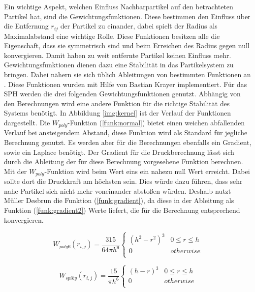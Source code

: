 \documentclass[intern,palatino]{cgBA}
\begin{document}
Ein wichtige Aspekt, welchen Einfluss Nachbarpartikel auf den betrachteten Partikel hat, sind die Gewichtungsfunktionen. Diese bestimmen den Einfluss über die Entfernung $r_{ij}$ der Partikel zu einander, dabei spielt der Radius als Maximalabstand eine wichtige Rolle. Diese Funktionen besitzen alle die Eigenschaft, dass sie symmetrisch sind und beim Erreichen des Radius gegen null konvergieren. Damit haben zu weit entfernte Partikel keinen Einfluss mehr. Gewichtungsfunktionen dienen dazu eine Stabilität in das Partikelsystem zu bringen. Dabei nähern sie sich üblich Ableitungen von bestimmten Funktionen an \cite{muller2003particle}. Diese Funktionen wurden mit Hilfe von Bastian Krayer implementiert.
\newline
Für das SPH werden die drei folgenden Gewichtungsfunktionen genutzt. Abhängig von den Berechnungen wird eine andere Funktion für die richtige Stabilität des Systems benötigt. In Abbildung \ref{img:kernel} ist der Verlauf der Funktionen dargestellt.
\newline
Die $W_{poly}$-Funktion (\ref{funk:normal}) bietet einen weichen abfallenden Verlauf bei ansteigendem Abstand, diese Funktion wird als Standard für jegliche Berechnung genutzt.
\newline
Es werden aber für die Berechnungen ebenfalls ein Gradient, sowie ein Laplace benötigt. Der Gradient für die Druckberechnung lässt sich durch die Ableitung der für diese Berechnung vorgesehene Funktion berechnen. Mit der $W_{poly}$-Funktion wird beim Wert eins ein nahezu null Wert erreicht. Dabei sollte dort die Druckkraft am höchsten sein.  Dies würde dazu führen, dass sehr nahe Partikel sich nicht mehr voneinander abstoßen würden. Deshalb nutzt Müller Desbrun \cite{desbrun1996smoothed} die Funktion (\ref{funk:gradient}), da diese in der Ableitung als Funktion  (\ref{funk:gradient2}) Werte liefert, die für die Berechnung entsprechend konvergieren.
\newline\newline

\begin{equation}\label{funk:normal}
	W_{poly6}(r_{i,j}) = \frac{315}{64 \pi h^9}   
	\begin{cases}
	(h^2 - r^2)^3 		& 0	\leq r \leq h	\\
	0					& otherwise			\\
	\end{cases}
\end{equation}

\begin{equation}\label{funk:gradient}
W_{spiky}(r_{i,j}) = \frac{15}{\pi h^6}   
\begin{cases}
(h - r)^3 		& 0	\leq r \leq h	\\
0					& otherwise			\\
\end{cases}
\end{equation}
\end{document}
